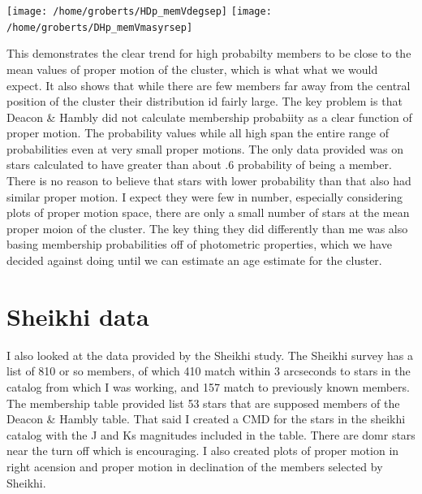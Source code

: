 \documentclass{article}
\begin{document}
\begin{center}
\texttt{[image: /home/groberts/HDp\_memVdegsep]}
\texttt{[image: /home/groberts/DHp\_memVmasyrsep]}
\end{center}

This demonstrates the clear trend for high probabilty members to be close to the mean values of proper motion of the cluster, which is what what we would expect.  It also shows that while there are few members far away from the central position of the cluster their distribution  id fairly large.  The key problem is that Deacon \& Hambly did not calculate membership probabiity as a clear function of proper motion. The probability values while all high span the entire range of probabilities even at very small proper motions.  The only data provided was on stars calculated to have greater than about .6 probability of being a member. There is no reason to believe that stars with lower probability than that also had similar proper motion. I expect they were few in number, especially considering plots of proper motion space, there are only a small number of stars at the mean proper moion of the cluster.  The key thing they did differently than me was also basing membership probabilities off of photometric properties, which we have decided against doing until we can estimate an age estimate for the cluster. 

\section{Sheikhi data}

I also looked at the data provided by the Sheikhi study.  The Sheikhi survey has a list of 810 or so members, of which 410 match within 3 arcseconds to stars in the catalog from which I was working, and 157 match to previously known members.  The membership table provided list 53 stars that are supposed members of the Deacon \& Hambly table.  That said I created a CMD for the stars in the sheikhi catalog with the J and Ks magnitudes included in the table.  There are domr stars near the turn off which is encouraging.  I also created plots of proper motion in right acension and proper motion in declination of the members selected by Sheikhi.
\end{document}
